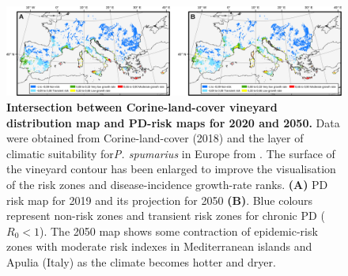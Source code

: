     \begin{figure}[!t]
        \includegraphics[width=1\textwidth]{Figures/vineyards.png}
        \caption{\textbf{Intersection between Corine-land-cover vineyard
                distribution map and PD-risk maps for 2020 and 2050.}  Data
            were obtained from
            Corine-land-cover (2018) and the layer of climatic suitability
            for\textit{P.
                spumarius} in Europe from \cite{Godefroid2021}. The surface of
            the vineyard
            contour has been enlarged to improve the visualisation of the risk
            zones and
            disease-incidence growth-rate ranks. \textbf{(A)} PD risk map for
            2019 and its
            projection for 2050 \textbf{(B)}. Blue colours represent non-risk
            zones and
            transient risk zones for chronic PD ($R_0 < 1$). The 2050 map shows
            some
            contraction of epidemic-risk zones with moderate risk indexes in
            Mediterranean
            islands and Apulia (Italy) as the climate becomes hotter and
            dryer.}
        \label{fig6}
    \end{figure}

